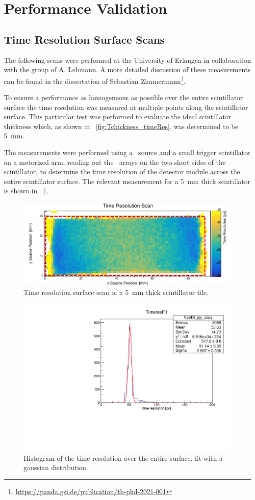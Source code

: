\documentclass[../BTOF_summary.tex]{subfiles}
\begin{document}
\section{Performance Validation}

\subsection{Time Resolution Surface Scans}
The following scans were performed at the University of Erlangen in collaboration with the group of A. Lehmann.
A more detailed discussion of these measurements can be found in the dissertation of Sebastian Zimmermann\footnote{\url{https://panda.gsi.de/publication/th-phd-2021-001}}.

To ensure a performance as homogeneous as possible over the entire scintillator surface the time resolution was measured at multiple points along the scintillator surface.
This particular test was performed to evaluate the ideal scintillator thickness which, as shown in \fig~\ref{fig:Tchickness_timeRes}, was determined to be \SI{5}{mm}.

The measurements were performed using a \sr\ source and a small trigger scintillator on a motorized arm, reading out the \sipm\ arrays on the two short sides of the scintillator, to determine the time resolution of the detector module across the entire scintillator surface.
The relevant measurement for a \SI{5}{mm} thick scintillator is shown in \fig~\ref{fig:Time_res_scan_erlangen}.

\begin{figure}[htbp]
    \centering
    \includegraphics*[width=.9\textwidth]{fig/TimeResolution_5mm.pdf}
    \caption{Time resolution surface scan of a \SI{5}{mm} thick scintillator tile.}
    \label{fig:Time_res_scan_erlangen}
\end{figure}

\begin{figure}
    \centering
    \includegraphics*[width=.7\textwidth]{fig/run52_widthfit.pdf}
    \caption{Histogram of the time resolution over the entire surface, fit with a gaussian distribution.}
    \label{fig:timeRes_scan_fit}
\end{figure}
    
\end{document}
